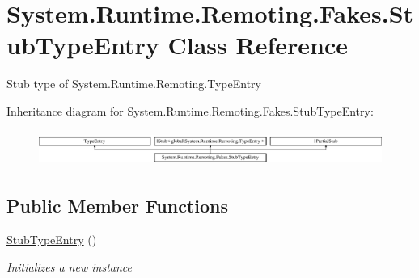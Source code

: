 \hypertarget{class_system_1_1_runtime_1_1_remoting_1_1_fakes_1_1_stub_type_entry}{\section{System.\-Runtime.\-Remoting.\-Fakes.\-Stub\-Type\-Entry Class Reference}
\label{class_system_1_1_runtime_1_1_remoting_1_1_fakes_1_1_stub_type_entry}
}


Stub type of System.\-Runtime.\-Remoting.\-Type\-Entry 


Inheritance diagram for System.\-Runtime.\-Remoting.\-Fakes.\-Stub\-Type\-Entry\-:\begin{figure}[H]
\begin{center}
\leavevmode
\includegraphics[height=1.185185cm]{class_system_1_1_runtime_1_1_remoting_1_1_fakes_1_1_stub_type_entry}
\end{center}
\end{figure}
\subsection*{Public Member Functions}
\begin{DoxyCompactItemize}
\item 
\hyperlink{class_system_1_1_runtime_1_1_remoting_1_1_fakes_1_1_stub_type_entry_a21306587c8c8bfa1c2cd0a232ac41449}{Stub\-Type\-Entry} ()
\begin{DoxyCompactList}\small\item\em Initializes a new instance\end{DoxyCompactList}\end{DoxyCompactItemize}

